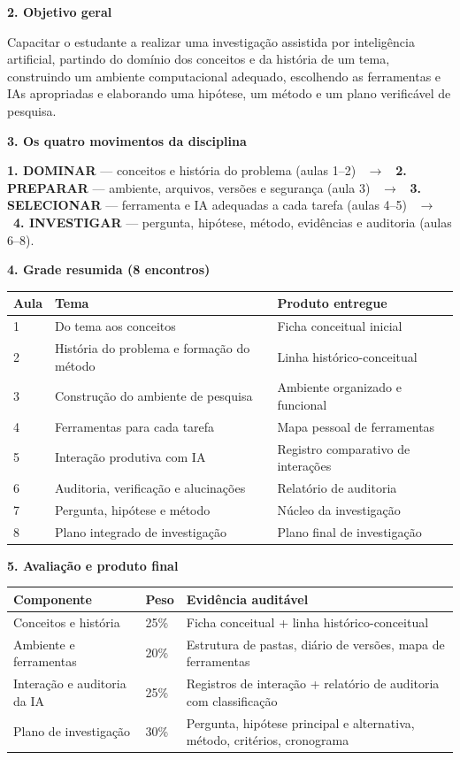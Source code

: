 \documentclass[11pt,a4paper]{article}
\newcommand{\sub}[1]{{\bfseries #1}\par\smallskip}
\begin{document}
\sub{2. Objetivo geral}

Capacitar o estudante a realizar uma investigação assistida por inteligência artificial,
partindo do domínio dos conceitos e da história de um tema, construindo um ambiente
computacional adequado, escolhendo as ferramentas e IAs apropriadas e elaborando uma
hipótese, um método e um plano verificável de pesquisa.

\sub{3. Os quatro movimentos da disciplina}

{\small
\textbf{1. DOMINAR} --- conceitos e história do problema (aulas 1--2) \ $\rightarrow$ \
\textbf{2. PREPARAR} --- ambiente, arquivos, versões e segurança (aula 3) \ $\rightarrow$ \
\textbf{3. SELECIONAR} --- ferramenta e IA adequadas a cada tarefa (aulas 4--5) \ $\rightarrow$ \
\textbf{4. INVESTIGAR} --- pergunta, hipótese, método, evidências e auditoria (aulas 6--8).
}

\sub{4. Grade resumida (8 encontros)}

{\small
\begin{tabular}{|p{}|p{}|p{}|}
\hline
\textbf{Aula} & \textbf{Tema} & \textbf{Produto entregue} \\
\hline
1 & Do tema aos conceitos & Ficha conceitual inicial \\
\hline
2 & História do problema e formação do método & Linha histórico-conceitual \\
\hline
3 & Construção do ambiente de pesquisa & Ambiente organizado e funcional \\
\hline
4 & Ferramentas para cada tarefa & Mapa pessoal de ferramentas \\
\hline
5 & Interação produtiva com IA & Registro comparativo de interações \\
\hline
6 & Auditoria, verificação e alucinações & Relatório de auditoria \\
\hline
7 & Pergunta, hipótese e método & Núcleo da investigação \\
\hline
8 & Plano integrado de investigação & Plano final de investigação \\
\hline
\end{tabular}
}

\sub{5. Avaliação e produto final}

{\small
\begin{tabular}{|p{}|p{}|p{}|}
\hline
\textbf{Componente} & \textbf{Peso} & \textbf{Evidência auditável} \\
\hline
Conceitos e história & 25\% & Ficha conceitual + linha histórico-conceitual \\
\hline
Ambiente e ferramentas & 20\% & Estrutura de pastas, diário de versões, mapa de ferramentas \\
\hline
Interação e auditoria da IA & 25\% & Registros de interação + relatório de auditoria com classificação \\
\hline
Plano de investigação & 30\% & Pergunta, hipótese principal e alternativa, método, critérios, cronograma \\
\hline
\end{tabular}
}
\end{document}
